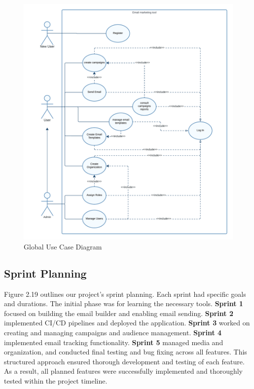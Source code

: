 \begin{figure}[ht]
	\centering
	\includegraphics[width=\linewidth]{Images//images/global use case diag.png}
	\caption{Global Use Case Diagram}
	\label{fig:Global Use Case Diagram}
\end{figure}

\newpage

\subsection{Sprint Planning}

Figure 2.19 outlines our project's sprint planning. Each sprint had specific goals and durations. The initial phase was for learning the necessary tools. \textbf{Sprint 1} focused on building the email builder and enabling email sending. \textbf{Sprint 2} implemented CI/CD pipelines and deployed the application. \textbf{Sprint 3} worked on creating and managing campaigns and audience management. \textbf{Sprint 4} implemented email tracking functionality. \textbf{Sprint 5} managed media and organization, and conducted final testing and bug fixing across all features. This structured approach ensured thorough development and testing of each feature. As a result, all planned features were successfully implemented and thoroughly tested within the project timeline.

